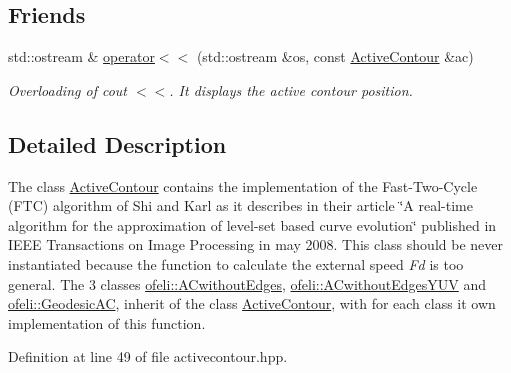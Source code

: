 \subsection*{Friends}
\begin{DoxyCompactItemize}
\item 
\hypertarget{classofeli_1_1_active_contour_a4ae6d808948cb0fe309be0d4c4d39755}{std\-::ostream \& \hyperlink{classofeli_1_1_active_contour_a4ae6d808948cb0fe309be0d4c4d39755}{operator$<$$<$} (std\-::ostream \&os, const \hyperlink{classofeli_1_1_active_contour}{Active\-Contour} \&ac)}\label{classofeli_1_1_active_contour_a4ae6d808948cb0fe309be0d4c4d39755}

\begin{DoxyCompactList}\small\item\em Overloading of cout $<$$<$. It displays the active contour position. \end{DoxyCompactList}\end{DoxyCompactItemize}


\subsection{Detailed Description}
The class \hyperlink{classofeli_1_1_active_contour}{Active\-Contour} contains the implementation of the Fast-\/\-Two-\/\-Cycle (F\-T\-C) algorithm of Shi and Karl as it describes in their article \char`\"{}\-A real-\/time algorithm for the approximation of level-\/set based curve evolution\char`\"{} published in I\-E\-E\-E Transactions on Image Processing in may 2008. This class should be never instantiated because the function to calculate the external speed {\itshape Fd} is too general. The 3 classes \hyperlink{classofeli_1_1_a_cwithout_edges}{ofeli\-::\-A\-Cwithout\-Edges}, \hyperlink{classofeli_1_1_a_cwithout_edges_y_u_v}{ofeli\-::\-A\-Cwithout\-Edges\-Y\-U\-V} and \hyperlink{classofeli_1_1_geodesic_a_c}{ofeli\-::\-Geodesic\-A\-C}, inherit of the class \hyperlink{classofeli_1_1_active_contour}{Active\-Contour}, with for each class it own implementation of this function. 

Definition at line 49 of file activecontour.\-hpp.



